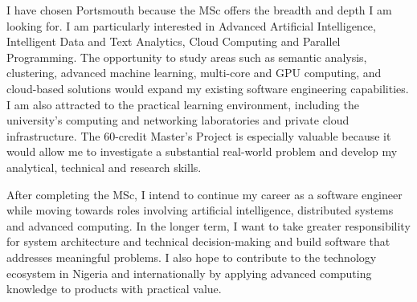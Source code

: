 \documentclass[11pt,a4paper]{article}
\begin{document}
I have chosen Portsmouth because the MSc offers the breadth and depth I am looking for. I am particularly interested in Advanced Artificial Intelligence, Intelligent Data and Text Analytics, Cloud Computing and Parallel Programming. The opportunity to study areas such as semantic analysis, clustering, advanced machine learning, multi-core and GPU computing, and cloud-based solutions would expand my existing software engineering capabilities. I am also attracted to the practical learning environment, including the university's computing and networking laboratories and private cloud infrastructure. The 60-credit Master's Project is especially valuable because it would allow me to investigate a substantial real-world problem and develop my analytical, technical and research skills.

After completing the MSc, I intend to continue my career as a software engineer while moving towards roles involving artificial intelligence, distributed systems and advanced computing. In the longer term, I want to take greater responsibility for system architecture and technical decision-making and build software that addresses meaningful problems. I also hope to contribute to the technology ecosystem in Nigeria and internationally by applying advanced computing knowledge to products with practical value.
\end{document}
